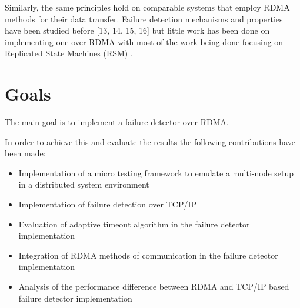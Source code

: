 \documentclass[bsc,frontabs,twoside,singlespacing,parskip,deptreport,hidel]{infthesis}     %
\begin{document}
Similarly, the same principles hold on comparable systems that employ RDMA methods for their data transfer. Failure detection mechanisms and properties have been studied before [13, 14, 15, 16] but little work has been done on implementing one over RDMA with most of the work being done focusing on Replicated State Machines (RSM) \cite{poke2015dare}.


\section{Goals}

The main goal is to implement a failure detector over RDMA.

In order to achieve this and evaluate the results the following contributions have been made:

\begin{itemize}
  \item Implementation of a micro testing framework to emulate a multi-node setup in a distributed system environment
  \item Implementation of failure detection over TCP/IP
  \item Evaluation of adaptive timeout algorithm in the failure detector implementation
  \item Integration of RDMA methods of communication in the failure detector implementation
  \item Analysis of the performance difference between RDMA and TCP/IP based failure detector implementation
\end{itemize}


\end{document}
